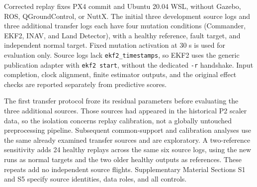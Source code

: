 Corrected replay fixes PX4 commit \texttt{} and Ubuntu 20.04 WSL, without Gazebo, ROS, QGroundControl, or NuttX. The initial three development source logs and three additional transfer logs each have four mutation conditions (Commander, EKF2, INAV, and Land Detector), with a healthy reference, fault target, and independent normal target. Fixed mutation activation at 30 s is used for evaluation only. Source logs lack \texttt{ekf2\_timestamps}, so EKF2 uses the generic publication adapter with \texttt{ekf2 start}, without the dedicated \texttt{-r} handshake. Input completion, clock alignment, finite estimator outputs, and the original effect checks are reported separately from predictive scores.

The first transfer protocol froze its residual parameters before evaluating the three additional sources. Those sources had appeared in the historical P2 scaler data, so the isolation concerns replay calibration, not a globally untouched preprocessing pipeline. Subsequent common-support and calibration analyses use the same already examined transfer sources and are exploratory. A two-reference sensitivity adds 24 healthy replays across the same six source logs, using the new runs as normal targets and the two older healthy outputs as references. These repeats add no independent source flights. Supplementary Material Sections S1 and S5 specify source identities, data roles, and all controls.


